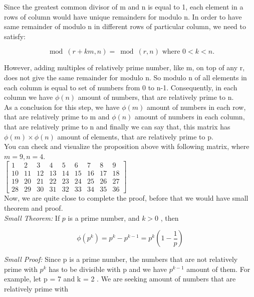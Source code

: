 \documentclass[11pt]{article}
\begin{document}
Since the greatest common divisor of m and n is equal to 1, each element in a rows of column would have unique remainders for modulo n. In order to have same remainder of modulo n in different rows of particular column, we need to satisfy: 

\begin{equation}
\bmod(r + km, n) = \bmod(r, n) \text{ where } 0 < k < n. 
\end{equation}

However, adding multiples of relatively prime number, like m, on top of any r, does not give the same remainder for modulo n. So modulo n of all elements in each column is equal to set of numbers from 0 to n-1. Consequently, in each column we have $\phi(n)$ amount of numbers, that are relatively prime to n. \\

As a conclusion for this step, we have $\phi(m)$ amount of numbers in each row, that are relatively prime to m and $\phi(n)$ amount of numbers in each column, that are relatively prime to n and finally we can say that, this matrix has $\phi(m) \times \phi(n)$ amount of elements, that are relatively prime to p. \\

You can check and visualize the proposition above with following matrix, where $m = 9, n = 4$.\\

$\begin{bmatrix} 1 & 2 & 3 & 4 & 5 & 6 & 7 & 8 & 9 \\ 10 & 11 & 12 & 13 & 14 & 15 & 16 & 17 & 18 \\ 19 & 20 & 21 & 22 & 23 & 24 & 25 & 26 & 27 \\ 28 & 29 & 30 & 31 & 32 & 33 & 34 & 35 & 36 \end{bmatrix}$ \\

Now, we are quite close to complete the proof, before that we would have small theorem and proof. \\

\textit{Small Theorem:} If $p$ is a prime number, and $k > 0$ , then 

\begin{equation}
\phi(p^k) = p^k - p^{k-1} = p^k(1 - \frac{1}{p}) 
\end{equation}

\textit{Small Proof:}  Since p is a prime number, the numbers that are not relatively prime with $p^{k}$ has to be divisible with p and we have $p^{k-1}$ amount of them. For example, let p = 7 and k = 2 . We are seeking amount of numbers that are relatively prime with
\end{document}
